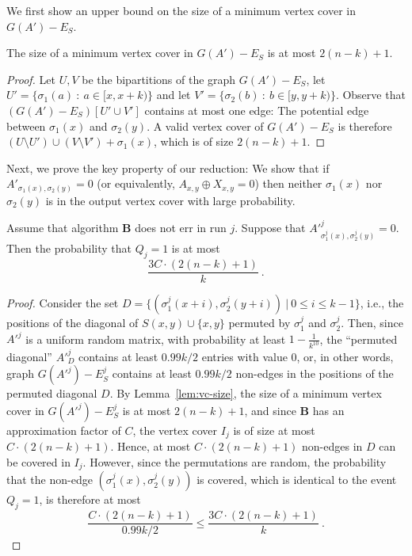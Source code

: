 We first show an upper bound on the size of a minimum vertex cover in $G(A') - E_S$.

\begin{lemma}\label{lem:vc-size}
 The size of a minimum vertex cover in $G(A') - E_S$ is at most $2(n-k) + 1$.
\end{lemma}
\begin{proof}
Let $U, V$ be the bipartitions of the graph $G(A') - E_S$, let $U' = \{\sigma_1(a) \ : \ a \in [x, x+k) \}$ and let
$V' = \{\sigma_2(b) \ : \ b \in [y, y+k) \}$. Observe that $(G(A') - E_S)[U' \cup V']$ 
contains at most one edge: The potential edge between $\sigma_1(x)$ and $\sigma_2(y)$. A valid vertex cover 
of $G(A') - E_S$ is therefore $(U \setminus U') \cup (V \setminus V') + \sigma_1(x)$,
which is of size $2(n-k) + 1$.
\end{proof}

Next, we prove the key property of our reduction: We show that if $A'_{\sigma_1(x), \sigma_2(y)} = 0$ (or equivalently, 
$A_{x,y} \oplus X_{x,y} = 0$)
then neither $\sigma_1(x)$ nor $\sigma_2(y)$ is in the output vertex cover with large probability.

\begin{lemma} \label{lem:covered}
 Assume that algorithm $\mathbf{B}$ does not err in run $j$. Suppose that 
 $A'^j_{\sigma^j_1(x), \sigma^j_2(y)} = 0$. Then the probability that $Q_j = 1$ is at most 
 $$\frac{3 C \cdot (2(n-k) + 1)}{k} \ .$$
\end{lemma}
\begin{proof}
 Consider the set $D  = \{ (\sigma^j_1(x + i), \sigma^j_2(y+i)) \ | \ 0 \le i \le k-1 \}$, i.e., the positions of the diagonal
 of $S(x,y) \cup \{x, y\}$ permuted by $\sigma^j_1$ and $\sigma^j_2$. Then, since $A'^j$ is a uniform random matrix, with probability
 at least $1-\frac{1}{k^{10}}$, the ``permuted diagonal'' $A'^j_{D}$ contains at least $0.99 k/ 2$ entries with value $0$,
 or, in other words, graph $G(A'^j) - E^j_S$ contains at least $0.99 k/ 2$ non-edges in the positions of the permuted diagonal $D$.
 By Lemma~\ref{lem:vc-size}, the size of a minimum vertex cover in $G(A'^{j}) - E^{j}_S$ is at most $2(n-k) + 1$, and since
 $\mathbf{B}$ has an approximation factor of $C$, the  vertex cover $I_j$ is of size at most $C \cdot (2(n-k) + 1)$. Hence, 
 at most $C \cdot (2(n-k) + 1)$ non-edges in $D$ can be covered in $I_j$. However, since the permutations are random, the 
 probability that the non-edge $(\sigma^j_1(x), \sigma^j_2(y))$
 is covered, which is identical to the event $Q_j = 1$, is therefore at most 
 $$\frac{C \cdot (2(n-k) + 1)}{0.99 k/ 2} \le \frac{3 C \cdot (2(n-k) + 1)}{k} \ .$$
\end{proof}


